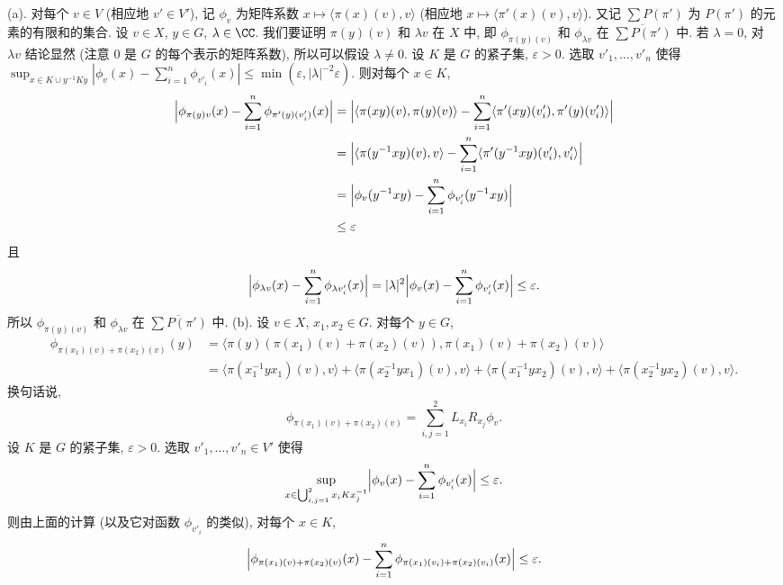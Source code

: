 \begin{solution}
(a). 对每个 $v \in V$ (相应地 $v' \in V'$), 记 $\phi_v$ 为矩阵系数 $x \longmapsto \langle \pi(x)(v), v \rangle$ (相应地 $x \longmapsto \langle \pi'(x)(v), v \rangle$). 又记 $\sum P(\pi')$ 为 $P(\pi')$ 的元素的有限和的集合.
设 $v \in X$, $y \in G$, $\lambda \in \CC$. 我们要证明 $\pi(y)(v)$ 和 $\lambda v$ 在 $X$ 中, 即 $\phi_{\pi(y)(v)}$ 和 $\phi_{\lambda v}$ 在 $\overline{\sum P(\pi')}$ 中. 若 $\lambda = 0$, 对 $\lambda v$ 结论显然 (注意 $0$ 是 $G$ 的每个表示的矩阵系数), 所以可以假设 $\lambda \neq 0$. 设 $K$ 是 $G$ 的紧子集, $\varepsilon > 0$. 选取 $v'_1, \ldots, v'_n$ 使得 $\sup_{x \in K \cup y^{-1}Ky}|\phi_v(x) - \sum_{i=1}^n\phi_{v'_i}(x)| \leq \min(\varepsilon, |\lambda|^{-2}\varepsilon)$. 则对每个 $x \in K$,
\begin{align*}
\Bigl|\phi_{\pi(y)v}(x) - \sum_{i=1}^n\phi_{\pi'(y)(v'_i)}(x)\Bigr| &= \Bigl|\langle \pi(xy)(v), \pi(y)(v) \rangle - \sum_{i=1}^n\langle \pi'(xy)(v'_i), \pi'(y)(v'_i) \rangle\Bigr| \\
&= \Bigl|\langle \pi(y^{-1}xy)(v), v \rangle - \sum_{i=1}^n\langle \pi'(y^{-1}xy)(v'_i), v'_i \rangle\Bigr| \\
&= \Bigl|\phi_v(y^{-1}xy) - \sum_{i=1}^n\phi_{v'_i}(y^{-1}xy)\Bigr| \\
&\leq \varepsilon
\end{align*}
且
\[
\Bigl|\phi_{\lambda v}(x) - \sum_{i=1}^n\phi_{\lambda v'_i}(x)\Bigr| = |\lambda|^2\Bigl|\phi_v(x) - \sum_{i=1}^n\phi_{v'_i}(x)\Bigr| \leq \varepsilon.
\]
所以 $\phi_{\pi(y)(v)}$ 和 $\phi_{\lambda v}$ 在 $\overline{\sum P(\pi')}$ 中.
(b). 设 $v \in X$, $x_1, x_2 \in G$. 对每个 $y \in G$,
\begin{align*}
\phi_{\pi(x_1)(v) + \pi(x_2)(v)}(y) &= \langle \pi(y)(\pi(x_1)(v) + \pi(x_2)(v)), \pi(x_1)(v) + \pi(x_2)(v) \rangle \\
&= \langle \pi(x_1^{-1}yx_1)(v), v \rangle + \langle \pi(x_2^{-1}yx_1)(v), v \rangle + \langle \pi(x_1^{-1}yx_2)(v), v \rangle + \langle \pi(x_2^{-1}yx_2)(v), v \rangle.
\end{align*}
换句话说,
\[
\phi_{\pi(x_1)(v) + \pi(x_2)(v)} = \sum_{i,j=1}^2 L_{x_i}R_{x_j}\phi_v.
\]
设 $K$ 是 $G$ 的紧子集, $\varepsilon > 0$. 选取 $v'_1, \ldots, v'_n \in V'$ 使得
\[
\sup_{x \in \bigcup_{i,j=1}^2 x_iKx_j^{-1}}\Bigl|\phi_v(x) - \sum_{i=1}^n\phi_{v'_i}(x)\Bigr| \leq \varepsilon.
\]
则由上面的计算 (以及它对函数 $\phi_{v'_i}$ 的类似), 对每个 $x \in K$,
\[
\Bigl|\phi_{\pi(x_1)(v) + \pi(x_2)(v)}(x) - \sum_{i=1}^n\phi_{\pi(x_1)(v_i) + \pi(x_2)(v_i)}(x)\Bigr| \leq \varepsilon.
\]
\end{solution}
